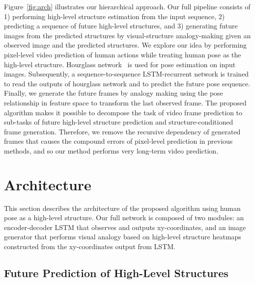 \documentclass{article}
\newcommand{\cutsectionup}{\vspace*{-0.1in}}
\newcommand{\cutsectiondown}{\vspace*{-0.05in}}
\newcommand{\cutsubsectionup}{\vspace*{-0.09in}}
\newcommand{\cutsubsectiondown}{\vspace*{-0.04in}}
\newcommand{\cutsectionup}{}
\newcommand{\cutsectiondown}{}
\newcommand{\cutsubsectionup}{}
\newcommand{\cutsubsectiondown}{}
\begin{document}
Figure~\ref{fig:arch} illustrates our hierarchical approach.
Our full pipeline consists of 1) performing high-level structure estimation from the input sequence, 2) predicting a sequence of future high-level structures, and 3) generating future images from the predicted structures by visual-structure analogy-making given an observed image and the predicted structures.
We explore our idea by performing pixel-level video prediction of human actions while treating human pose as the high-level structure.
Hourglass network~\cite{hourglass} is used for pose estimation on input images.
Subsequently, a sequence-to-sequence LSTM-recurrent network is trained to read the outputs of hourglass network and to predict the future pose sequence.
Finally, we generate the future frames by analogy making using the pose relationship in feature space to transform the last observed frame.
The proposed algorithm makes it possible to decompose the task of video frame prediction to sub-tasks of future high-level structure prediction and structure-conditioned frame generation.
Therefore, we remove the recursive dependency of generated frames that causes the compound errors of pixel-level prediction in previous methods, and so our method performs very long-term video prediction.
\cutsectionup\section{Architecture}\label{sec:architecture}\cutsectiondown%
This section describes the architecture of the proposed algorithm using human pose as a high-level structure.
Our full network is composed of two modules: an encoder-decoder LSTM that observes and outputs xy-coordinates, and an image generator that performs visual analogy based on high-level structure heatmaps constructed from the xy-coordinates output from LSTM.

\cutsubsectionup\subsection{Future Prediction of High-Level Structures}%
\end{document}
